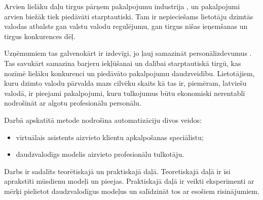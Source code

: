 Arvien lielāku daļu tirgus pārņem pakalpojumu industrija
, un pakalpojumi arvien biežāk tiek piedāvāti starptautiski. Tam ir nepieciešams lietotāju dzimtās valodas atbalsts gan valstu valodu regulējumu, gan tirgus nišas ieņemšanas un tirgus konkurences dēļ.

Uzņēmumiem tas galvenokārt ir izdevīgi, jo ļauj samazināt personālizdevumus
. Tas savukārt samazina barjeru iekļūšanai un dalībai starptautiskā tirgū, kas nozīmē lielāku konkurenci un piedāvāto pakalpojumu daudzveidību. Lietotājiem, kuru dzimto valodu pārvalda mazs cilvēku skaits kā tas ir, piemēram, latviešu valodā, ir pieejami pakalpojumi, kuru tulkojumus būtu ekonomiski nerentabli nodrošināt ar algotu profesionālu personālu.

Darbā apskatītā metode nodrošina automatizāciju divos veidos: 
\begin{itemize}
	\item virtuālais asistents aizvieto klientu apkalpošanas speciālistu;
	\item daudzvalodīgs modelis aizvieto profesionālu tulkotāju.
\end{itemize}

Darbs ir sadalīts teorētiskajā un praktiskajā daļā. Teoretiskajā daļā ir īsi aprakstīti mūsdienu modeļi un pieejas. Praktiskajā daļā ir veikti eksperimenti ar mērķi pielietot daudzvalodīgus modeļus un salīdzināt tos ar esošiem risinājumiem. 